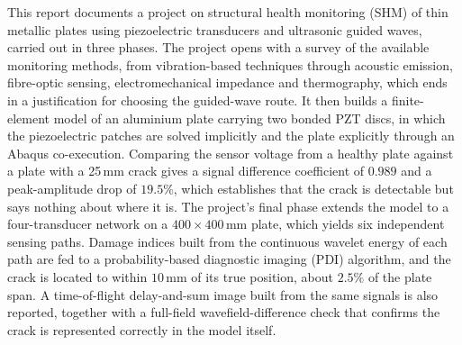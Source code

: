 This report documents a project on structural health monitoring (SHM) of thin metallic plates using
piezoelectric transducers and ultrasonic guided waves, carried out in three phases. The project opens with a
survey of the available monitoring methods, from vibration-based techniques through acoustic emission,
fibre-optic sensing, electromechanical impedance and thermography, which ends in a justification for
choosing the guided-wave route. It then builds a finite-element model of an aluminium plate carrying two
bonded PZT discs, in which the piezoelectric patches are solved implicitly and the plate explicitly through an
Abaqus co-execution. Comparing the sensor voltage from a healthy plate against a plate with a 25\,mm crack
gives a signal difference coefficient of $0.989$ and a peak-amplitude drop of $19.5\%$, which establishes that
the crack is detectable but says nothing about where it is. The project's final phase extends the model to a
four-transducer network on a $400\times400$\,mm plate, which yields six independent sensing paths. Damage indices built
from the continuous wavelet energy of each path are fed to a probability-based diagnostic imaging (PDI)
algorithm, and the crack is located to within $10$\,mm of its true position, about $2.5\%$ of the plate span. A
time-of-flight delay-and-sum image built from the same signals is also reported, together with a full-field
wavefield-difference check that confirms the crack is represented correctly in the model itself.
